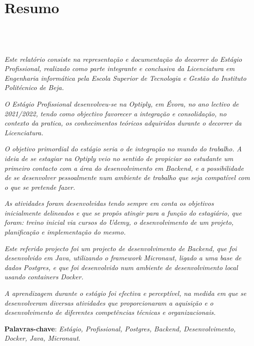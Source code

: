 \chapter{Resumo}
\section*{\textit{\TITULO}\\  {\small{\textit{\SUBTITULO}}}}

\textit{Este relatório consiste na representação e documentação do decorrer do Estágio Profissional, realizado como parte integrante e conclusiva da Licenciatura em Engenharia informática pela Escola Superior de Tecnologia e Gestão do Instituto Politécnico de Beja.}

\textit{O Estágio Profissional desenvolveu-se na Optiply, em Évora, no ano lectivo de 2021/2022, tendo como objectivo favorecer a integração e consolidação, no contexto da pratica, os conhecimentos teóricos adquiridos durante o decorrer da Licenciatura.}

\textit{O objetivo primordial do estágio seria o de integração no mundo do trabalho. A ideia de se estagiar na Optiply veio no sentido de propiciar ao estudante um primeiro contacto com a área do desenvolvimento em Backend, e a possibilidade de se desenvolver pessoalmente num ambiente de trabalho que seja compatível com o que se pretende fazer.}

\textit{As atividades foram desenvolvidas tendo sempre em conta os objetivos inicialmente delineados e que se propôs atingir para a função do estagiário, que foram: treino inicial via cursos do Udemy, o desenvolvimento de um projeto, planificação e implementação do mesmo.}

\textit{Este referido projecto foi um projecto de desenvolvimento de Backend, que foi desenvolvido em Java, utilizando o framework Micronaut, ligado a uma base de dados Postgres, e que foi desenvolvido num ambiente de desenvolvimento local usando containers Docker.}

\textit{A aprendizagem durante o estágio foi efectiva e perceptível, na medida em que se desenvolveram diversas atividades que proporcionaram a aquisição e o desenvolvimento de diferentes competências técnicas e organizacionais.}

\textbf{Palavras-chave}: \textit{Estágio, Profissional, Postgres, Backend, Desenvolvimento, Docker, Java, Micronaut}.
